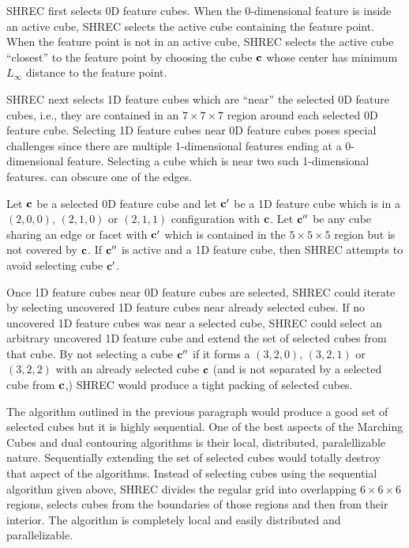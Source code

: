 SHREC first selects 0D feature cubes.
When the 0-dimensional feature is inside an active cube,
SHREC selects the active cube containing the feature point.
When the feature point is not in an active cube,
SHREC selects the active cube ``closest'' to the feature point
by choosing the cube $\mathbf{c}$ whose center has minimum $L_\infty$ distance
to the feature point.

SHREC next selects 1D feature cubes which are ``near'' 
the selected 0D feature cubes,
i.e., they are contained in an $7 \times 7 \times 7$ region
around each selected 0D feature cube.
Selecting 1D feature cubes near 0D feature cubes poses special challenges
since there are multiple 1-dimensional features ending 
at a 0-dimensional feature.
Selecting a cube which is near two such 1-dimensional features.
can obscure one of the edges.

Let $\mathbf{c}$ be a selected 0D feature cube and let $\mathbf{c}'$ be a 1D feature cube
which is in a $(2,0,0)$, $(2,1,0)$ or $(2,1,1)$ configuration with $\mathbf{c}$.
Let $\mathbf{c}''$ be any cube sharing an edge or facet with $\mathbf{c}'$
which is contained in the $5 \times 5 \times 5$ region
but is not covered by $\mathbf{c}$.
If $\mathbf{c}''$ is active and a 1D feature cube,
then SHREC attempts to avoid selecting cube $\mathbf{c}'$.

Once 1D feature cubes near 0D feature cubes are selected,
SHREC could iterate by selecting uncovered 1D feature cubes 
near already selected cubes.
If no uncovered 1D feature cubes was near a selected cube,
SHREC could select an arbitrary uncovered 1D feature cube
and extend the set of selected cubes from that cube.
By not selecting a cube $\mathbf{c}''$ 
if it forms a $(3,2,0)$, $(3,2,1)$ or $(3,2,2)$
with an already selected cube $\mathbf{c}$ 
(and is not separated by a selected cube from $\mathbf{c}$,)
SHREC would produce a tight packing of selected cubes.

The algorithm outlined in the previous paragraph would produce
a good set of selected cubes but it is highly sequential.
One of the best aspects of the Marching Cubes and dual contouring algorithms
is their local, distributed, paralellizable nature.
Sequentially extending the set of selected cubes would totally destroy
that aspect of the algorithms.
Instead of selecting cubes using the sequential algorithm given above,
SHREC divides the regular grid 
into overlapping $6 \times 6 \times 6$ regions,
selects cubes from the boundaries of those regions and then from their interior.
The algorithm is completely local and easily distributed and parallelizable.


